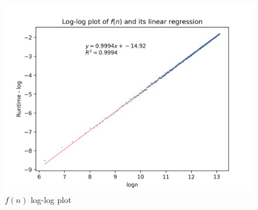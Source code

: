 \documentclass[titlepage, 12pt]{article}
\begin{document}
\begin{figure}[H]
    \includegraphics[width=0.8\linewidth]{fn-log-linreg.png}
    \centering
    \caption{$f(n)$ log-log plot}
    \label{fig:fn-log-linreg}
\end{figure}
\end{document}
